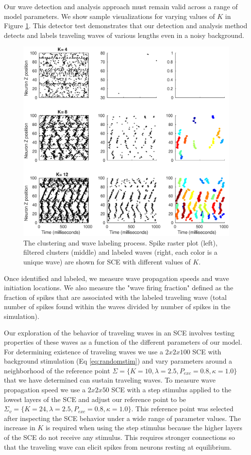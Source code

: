Our wave detection and analysis approach must remain valid across a range of model parameters. 
We show sample visualizations for varying values of $K$ in Figure \ref{fig:detector_test}.
This detector test demonstrates that our detection and analysis method detects and labels traveling waves of various lengths even in a noisy background.
\begin{figure}[!htb]
 \centering
   \includegraphics[width=\textwidth]{fig/DetectorTest}
    \caption{The clustering and wave labeling process. Spike raster plot (left), filtered clusters (middle) and labeled waves (right, each color is a unique wave) 
	    are shown for SCE with different values of $K$. }
  \label{fig:detector_test}
\end{figure}

\FloatBarrier
Once identified and labeled, we measure wave propagation speeds and wave initiation locations. 
We also measure the "wave firing fraction" defined as the fraction of spikes that are associated with the labeled traveling wave (total number of spikes found within the waves divided by number of spikes in the simulation). 

Our exploration of the behavior of traveling waves in an SCE involves testing properties of these waves as a function of the different parameters of our model.
For determining existence of traveling waves we use a $2x2x100$ SCE  with background stimulation (Eq \ref{eq:randomstim}) and vary parameters around a neighborhood of the reference point $\Sigma = \{K=10,\lambda=2.5,P_{exc}=0.8,\kappa=1.0 \}$ that we have determined can sustain traveling waves.
To measure wave propagation speed we use a $2x2x50$ SCE with  a step stimulus applied to the lowest layers of the SCE and adjust our reference point to be $\Sigma_v = \{K=24,\lambda=2.5,P_{exc}=0.8,\kappa=1.0 \}$.
This reference point was selected after inspecting the SCE behavior under a wide range of parameter values.
The increase in $K$ is required when using the step stimulus because the higher layers of the SCE do not receive any stimulus.
This requires stronger connections so that the traveling wave can elicit spikes from neurons resting at equilibrium.

